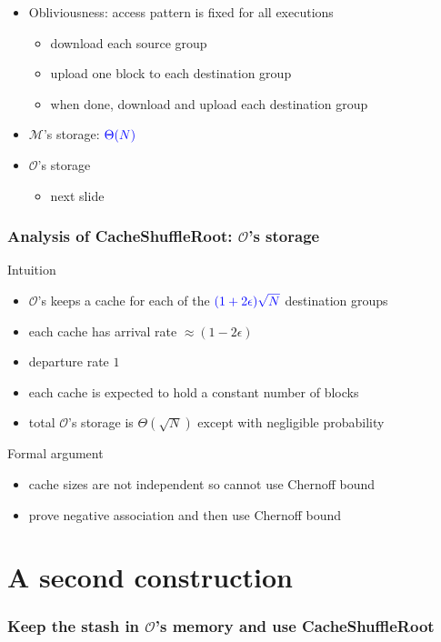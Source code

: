 \documentclass[]{beamer}
\newcommand{\owner}{\mathcal{O}}
\newcommand{\manager}{\mathcal{M}}
\begin{document}
{\begin{frame}
\begin{itemize}[<+->]
 \item {\color{olive} Obliviousness}: access pattern is fixed for all executions
    \begin{itemize}
        \item download each source group
        \item upload one block to each destination group
        \item when done, download and upload each destination group
    \end{itemize}

  \item {\color{olive} $\manager$'s storage}: $\color{blue}\Theta(N)$

    \item {\color{olive} $\owner$'s storage}
    \begin{itemize}
        \item next slide
    \end{itemize}
\end{itemize}
\end{frame}

\begin{frame}
\frametitle{Analysis of CacheShuffleRoot: $\owner$'s storage}

{\color{brown} Intuition}

\begin{itemize}[<+->]
\item  $\owner$'s keeps a cache for each of the $\color{blue}(1+2\epsilon)\sqrt{N}$ destination groups
\item each cache has arrival rate $\approx(1-2\epsilon)$
\item departure rate $1$
\item each cache is expected to hold a constant number of blocks
\item total $\owner$'s storage is $\Theta(\sqrt{N})$ except with negligible probability
\end{itemize}

\pause
{\color{brown} Formal argument}
\begin{itemize}[<+->]
\item cache sizes are not independent so cannot use Chernoff bound
\item prove negative association and then use Chernoff bound 
\end{itemize}
\end{frame}

\section{A second construction}
\begin{frame}
\frametitle{Keep the stash in $\owner$'s memory and use CacheShuffleRoot}


\end{frame}}
\end{document}
